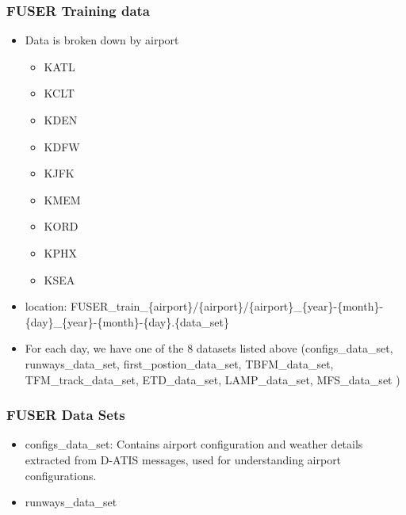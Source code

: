 \documentclass[11pt,xcolor={dvipsnames},hyperref={pdftex,pdfpagemode=UseNone,hidelinks,pdfdisplaydoctitle=true},usepdftitle=false]{beamer}
\begin{document}
\begin{frame}
	\frametitle{FUSER Training data}
	\begin{itemize}
		\item Data is broken down by airport
		\begin{itemize}
			\item KATL
			\item KCLT
			\item KDEN
			\item KDFW
			\item KJFK
			\item KMEM
			\item KORD
			\item KPHX
			\item KSEA
		\end{itemize}
		\item location: FUSER\_train\_\{airport\}/\{airport\}/\{airport\}\_\{year\}-\{month\}-\{day\}\_\{year\}-\{month\}-\{day\}.\{data\_set\}
		\item For each day, we have one of the 8 datasets listed above (configs\_data\_set, runways\_data\_set, first\_postion\_data\_set, TBFM\_data\_set, TFM\_track\_data\_set, ETD\_data\_set, LAMP\_data\_set, MFS\_data\_set )
	\end{itemize}
\end{frame}

\begin{frame}
	\frametitle{FUSER Data Sets}
	\begin{itemize}
		\item configs\_data\_set: Contains airport configuration and weather details extracted from D-ATIS messages, used for understanding airport configurations.
		\item runways\_data\_set
	\end{itemize}
\end{frame}
\end{document}
